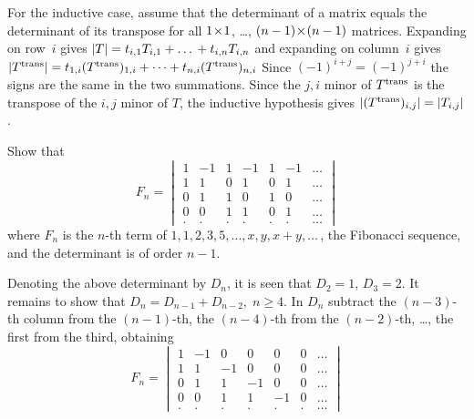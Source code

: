 \begin{exercises}
\begin{answer}
      For the inductive case, 
      assume that the determinant of a matrix equals the determinant of
      its transpose for all \( 1 \! \times \! 1 \), \ldots, \( (n-1) \! \times \! (n-1) \)
      matrices.
      Expanding on row~\( i \) gives
      \( \deter{T}=t_{i,1}T_{i,1}+\dots\,+t_{i,n}T_{i,n} \)
      and expanding on column~\( i \) gives
      \( \deter{\trans{T}}=t_{1,i}(\trans{T})_{1,i}
           +\dots+t_{n,i}(\trans{T})_{n,i} \)
      Since \( (-1)^{i+j}=(-1)^{j+i} \) the signs are the same in the
      two summations.
      Since the \( j,i \) minor of \( {{T}^{\rm trans}} \) is the transpose
      of the \( i,j \) minor of \( T \), the inductive hypothesis
      gives \( \deter{(\trans{T})_{i,j}}=\deter{T_{i,j}} \).  
    \end{answer}
  \puzzle \item 
    Show that
    \begin{equation*}
      F_n=
      \begin{vmatrix}
        1  &-1  &1  &-1  &1  &-1  &\ldots  \\
        1  &1   &0  &1   &0  &1   &\ldots  \\
        0  &1   &1  &0   &1  &0   &\ldots  \\
        0  &0   &1  &1   &0  &1   &\ldots  \\
        .  &.   &.  &.   &.  &.   &\ldots
      \end{vmatrix}
    \end{equation*}
    where \( F_n \) is the \( n \)-th term of
    \( 1,1,2,3,5,\dots,x,y,x+y,\ldots\, \), the Fibonacci sequence,
    and the determinant is of order \( n-1 \).
    \cite{Monthly49p409}
    \begin{answer}
      \answerasgiven %
      Denoting the above determinant by \( D_n \), it is seen that
      \( D_2=1 \), \( D_3=2 \).
      It remains to show that \( D_n=D_{n-1}+D_{n-2},\; n\geq 4 \).
      In \( D_n \) subtract the \( (n-3) \)-th column from the \( (n-1) \)-th,
      the \( (n-4) \)-th from the \( (n-2) \)-th, \ldots, the first from
      the third, obtaining
      \begin{equation*}
        F_n=
        \begin{vmatrix}
          1  &-1  &0  &0   &0  &0   &\ldots  \\
          1  &1   &-1 &0   &0  &0   &\ldots  \\
          0  &1   &1  &-1  &0  &0   &\ldots  \\
          0  &0   &1  &1   &-1 &0   &\ldots  \\
          .  &.   &.  &.   &.  &.   &\ldots

\end{vmatrix}
\end{equation*}
\end{answer}
\end{exercises}
